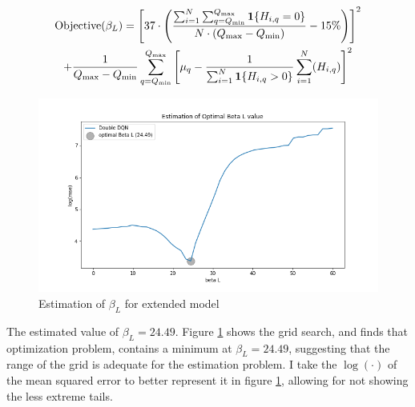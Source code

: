 \begin{multline}
   \text{Objective}(\beta_L) =  \left[ 37 \cdot \left(\frac{\sum_{i=1}^{N} \sum_{q=Q_{\min}}^{Q_{\max}} \mathbf{1}\{H_{i,q} = 0\}}{ N \cdot (Q_{\max} - Q_{\min} )} - 15\% \right) \right]^2 \\ + \frac{1}{Q_{\max} - Q_{\min}}\sum_{q=Q_{\min}}^{Q_{\max}} \left[ \mu_q - \frac{1}{\sum_{i=1}^{N} \mathbf{1}\{H_{i,q} > 0\}}\sum_{i=1}^N (H_{i,q})\right]^2
\end{multline}

\begin{figure}[ht]
    \centering
    \includegraphics[scale=0.4]{figures/ddqn_extended_model_estimation_beta_L.png}
    \caption{Estimation of $\beta_L$ for extended model}
    \label{fig:estimation_extended}
\end{figure}

The estimated value of $\beta_L = 24.49$. Figure \ref{fig:estimation_extended} shows the grid search, and finds that optimization problem, contains a minimum at $\beta_L = 24.49$, suggesting that the range of the grid is adequate for the estimation problem. I take the $\log (\cdot)$ of the mean squared error to better represent it in figure \ref{fig:estimation_extended}, allowing for not showing the less extreme tails.